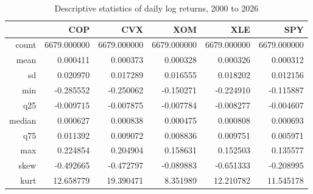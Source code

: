 \begin{table}[ht]
\centering
\caption{Descriptive statistics of daily log returns, 2000 to 2026} 
\label{tab:summary_stats}
\begin{tabular}{rrrrrr}
  \toprule
 & COP & CVX & XOM & XLE & SPY \\ 
  \midrule
count & 6679.000000 & 6679.000000 & 6679.000000 & 6679.000000 & 6679.000000 \\ 
  mean & 0.000411 & 0.000373 & 0.000328 & 0.000326 & 0.000312 \\ 
  sd & 0.020970 & 0.017289 & 0.016555 & 0.018202 & 0.012156 \\ 
  min & -0.285552 & -0.250062 & -0.150271 & -0.224910 & -0.115887 \\ 
  q25 & -0.009715 & -0.007875 & -0.007784 & -0.008277 & -0.004607 \\ 
  median & 0.000627 & 0.000838 & 0.000475 & 0.000808 & 0.000693 \\ 
  q75 & 0.011392 & 0.009072 & 0.008836 & 0.009751 & 0.005971 \\ 
  max & 0.224854 & 0.204904 & 0.158631 & 0.152503 & 0.135577 \\ 
  skew & -0.492665 & -0.472797 & -0.089883 & -0.651333 & -0.208995 \\ 
  kurt & 12.658779 & 19.390471 & 8.351989 & 12.210782 & 11.545178 \\ 
   \bottomrule
\end{tabular}
\end{table}
